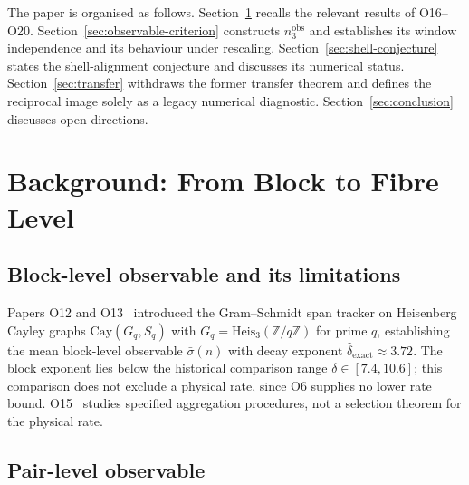 \documentclass[11pt,a4paper]{article}
\theoremstyle{definition}
\theoremstyle{remark}
\begin{document}
  The paper is organised as follows.
  Section~\ref{sec:background} recalls the relevant results of
  O16--O20.
  Section~\ref{sec:observable-criterion} constructs
  $n_3^{\mathrm{obs}}$ and establishes its window independence
  and its behaviour under rescaling.
  Section~\ref{sec:shell-conjecture} states the shell-alignment
  conjecture and discusses its numerical status.
  Section~\ref{sec:transfer} withdraws the former transfer theorem and defines the reciprocal
  image solely as a legacy numerical diagnostic.
  Section~\ref{sec:conclusion} discusses open directions.

  \section{Background: From Block to Fibre Level}
  \label{sec:background}

  \subsection{Block-level observable and its limitations}

    Papers O12 and O13~\cite{Beau2026a16,Beau2026a17} introduced
    the Gram--Schmidt span tracker on Heisenberg Cayley graphs
    $\mathrm{Cay}(G_q, S_q)$ with
    $G_q = \mathrm{Heis}_3(\mathbb{Z}/q\mathbb{Z})$ for prime
    $q$, establishing the mean block-level observable
    $\bar{\sigma}(n)$ with decay exponent
    $\hat{\delta}_{\mathrm{exact}} \approx 3.72$.
    The block exponent lies below the historical comparison range
    $\delta\in[7.4,10.6]$; this comparison does not exclude a physical
    rate, since O6 supplies no lower rate bound.
    O15~\cite{Beau2026a19} studies specified aggregation procedures,
    not a selection theorem for the physical rate.

  \subsection{Pair-level observable}
\end{document}
